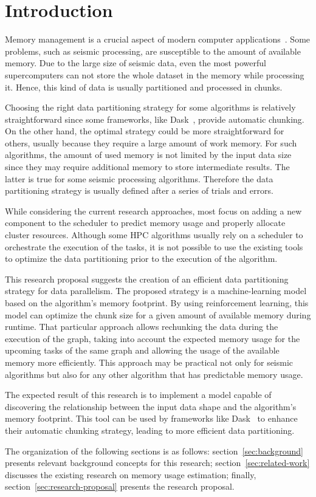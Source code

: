 \section{Introduction}
\label{sec:introduction}

Memory management is a crucial aspect of modern computer applications~\cite{pupykina2019}.
Some problems, such as seismic processing, are susceptible to the amount of available memory.
Due to the large size of seismic data, even the most powerful supercomputers can not store the whole dataset in the memory while processing it.
Hence, this kind of data is usually partitioned and processed in chunks.

Choosing the right data partitioning strategy for some algorithms is relatively straightforward since some frameworks, like Dask~\cite{dask}, provide automatic chunking.
On the other hand, the optimal strategy could be more straightforward for others, usually because they require a large amount of work memory.
For such algorithms, the amount of used memory is not limited by the input data size since they may require additional memory to store intermediate results.
The latter is true for some seismic processing algorithms.
Therefore the data partitioning strategy is usually defined after a series of trials and errors.

While considering the current research approaches, most focus on adding a new component to the scheduler to predict memory usage and properly allocate cluster resources.
Although some \ac{HPC} algorithms usually rely on a scheduler to orchestrate the execution of the tasks, it is not possible to use the existing tools to optimize the data partitioning prior to the execution of the algorithm.

This research proposal suggests the creation of an efficient data partitioning strategy for data parallelism.
The proposed strategy is a machine-learning model based on the algorithm's memory footprint.
By using reinforcement learning, this model can optimize the chunk size for a given amount of available memory during runtime.
That particular approach allows rechunking the data during the execution of the graph, taking into account the expected memory usage for the upcoming tasks of the same graph and allowing the usage of the available memory more efficiently.
This approach may be practical not only for seismic algorithms but also for any other algorithm that has predictable memory usage.

The expected result of this research is to implement a model capable of discovering the relationship between the input data shape and the algorithm's memory footprint.
This tool can be used by frameworks like Dask~\cite{dask} to enhance their automatic chunking strategy, leading to more efficient data partitioning.

The organization of the following sections is as follows:
section~\ref{sec:background} presents relevant background concepts for this research;
section~\ref{sec:related-work} discusses the existing research on memory usage estimation;
finally, section~\ref{sec:research-proposal} presents the research proposal.

